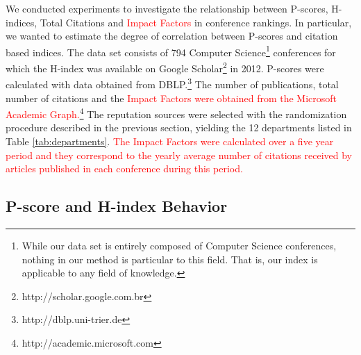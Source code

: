 \documentclass[notitlepage]{svjour3}
\begin{document}
We conducted experiments to investigate the relationship between P-scores, H-indices, Total Citations
and \textcolor{red}{Impact Factors} in conference rankings. In particular, we wanted to estimate the degree of correlation 
between P-scores and citation based indices. The data set consists of 794
Computer Science\footnote{
While our data set is entirely composed of Computer Science conferences, nothing in our method is
particular to this field. That is, our index is applicable to any field of knowledge.
} 
conferences
for which the H-index was available on Google Scholar\footnote{http://scholar.google.com.br}
in 2012. P-scores were calculated with
data obtained from DBLP.\footnote{http://dblp.uni-trier.de} The number of publications,
total number of citations and the \textcolor{red}{Impact Factors were obtained from the Microsoft
Academic Graph.}\footnote{http://academic.microsoft.com}
The reputation sources
were selected with the randomization procedure described in the previous section, 
yielding the 12 departments listed in Table \ref{tab:departments}. \textcolor{red}{The Impact Factors 
were calculated over a five year period and they correspond to the yearly 
average number of citations received by articles published in each conference during 
this period.}


\subsection{P-score and H-index Behavior}
\end{document}
